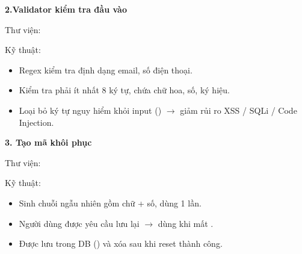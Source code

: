 \textbf{2.Validator kiểm tra đầu vào}

Thư viện:  

Kỹ thuật:
\begin{itemize}
    \item Regex kiểm tra định dạng email, số điện thoại.
    \item Kiểm tra  phải ít nhất 8 ký tự, chứa chữ hoa, số, ký hiệu.
    \item Loại bỏ ký tự nguy hiểm khỏi input () $\rightarrow$ giảm rủi ro XSS / SQLi / Code Injection.
\end{itemize}

\textbf{3. Tạo mã khôi phục}

Thư viện:  

Kỹ thuật:
\begin{itemize}
    \item Sinh chuỗi ngẫu nhiên gồm chữ + số, dùng 1 lần.
    \item Người dùng được yêu cầu lưu lại $\rightarrow$ dùng khi mất .
    \item Được lưu trong DB () và xóa sau khi reset thành công.
\end{itemize}

